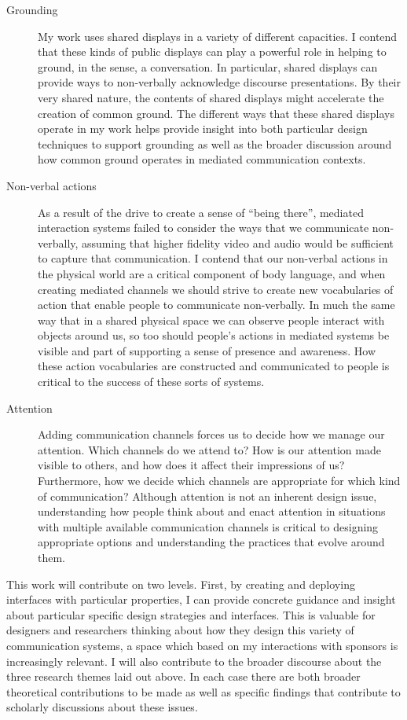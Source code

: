 \begin{description}
	\item[Grounding]{My work uses shared displays in a variety of different capacities. I contend that these kinds of public displays can play a powerful role in helping to ground, in the \citet{Clark:1989uc} sense, a conversation. In particular, shared displays can provide ways to non-verbally acknowledge discourse presentations. By their very shared nature, the contents of shared displays might accelerate the creation of common ground. The different ways that these shared displays operate in my work helps provide insight into both particular design techniques to support grounding as well as the broader discussion around how common ground operates in mediated communication contexts.}
	\item[Non-verbal actions]{As a result of the drive to create a sense of ``being there'', mediated interaction systems failed to consider the ways that we communicate non-verbally, assuming that higher fidelity video and audio would be sufficient to capture that communication. I contend that our non-verbal actions in the physical world are a critical component of body language, and when creating mediated channels we should strive to create new vocabularies of action that enable people to communicate non-verbally. In much the same way that in a shared physical space we can observe people interact with objects around us, so too should people's actions in mediated systems be visible and part of supporting a sense of presence and awareness. How these action vocabularies are constructed and communicated to people is critical to the success of these sorts of systems.}
	\item[Attention]{Adding communication channels forces us to decide how we manage our attention. Which channels do we attend to? How is our attention made visible to others, and how does it affect their impressions of us? Furthermore, how we decide which channels are appropriate for which kind of communication? Although attention is not an inherent design issue, understanding how people think about and enact attention in situations with multiple available communication channels is critical to designing appropriate options and understanding the practices that evolve around them.}
\end{description}

This work will contribute on two levels. First, by creating and deploying interfaces with particular properties, I can provide concrete guidance and insight about particular specific design strategies and interfaces. This is valuable for designers and researchers thinking about how they design this variety of communication systems, a space which based on my interactions with sponsors is increasingly relevant. I will also contribute to the broader discourse about the three research themes laid out above. In each case there are both broader theoretical contributions to be made as well as specific findings that contribute to scholarly discussions about these issues.




